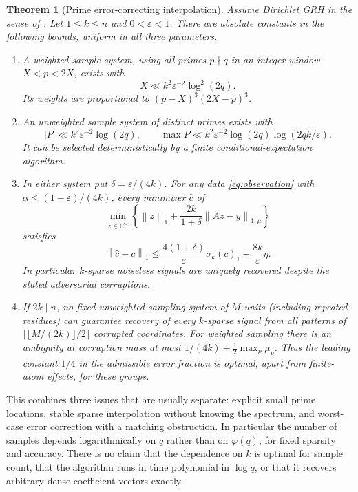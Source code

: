 \documentclass[11pt]{article}
\newtheorem{theorem}{Theorem}[section]
\theoremstyle{remark}\newtheorem{remark}[theorem]{Remark}
\newcommand{\C}{\mathbb C}
\newcommand{\norm}[1]{\left\|#1\right\|}
\begin{document}
\begin{theorem}[Prime error-correcting interpolation]\label{thm:main}
Assume Dirichlet GRH in the sense of \cite{sernau,article}. Let $1\le k\le n$ and $0<\varepsilon<1$. There are absolute constants in the following bounds, uniform in all three parameters.
\begin{enumerate}
\item A weighted sample system, using all primes $p\nmid q$ in an integer window $X<p<2X$, exists with
\[
 X\ll k^2\varepsilon^{-2}\log^2(2q).
\]
Its weights are proportional to $(p-X)^3(2X-p)^3$.
\item An unweighted sample system of distinct primes exists with
\[
 |P|\ll k^2\varepsilon^{-2}\log(2q),\qquad
 \max P\ll k^2\varepsilon^{-2}\log(2q)\log(2qk/\varepsilon).
\]
It can be selected deterministically by a finite conditional-expectation algorithm.
\item In either system put $\delta=\varepsilon/(4k)$. For any data \eqref{eq:observation} with $\alpha\le(1-\varepsilon)/(4k)$, every minimizer $\widehat c$ of
\begin{equation}\label{eq:decoder}
 \min_{z\in\C^{\widehat G}}\left\{\norm{z}_1+\frac{2k}{1+\delta}\norm{Az-y}_{1,\mu}\right\}
\end{equation}
satisfies
\begin{equation}\label{eq:stability-main}
 \norm{\widehat c-c}_1\le \frac{4(1+\delta)}{\varepsilon}\sigma_k(c)_1+
 \frac{8k}{\varepsilon}\eta.
\end{equation}
In particular $k$-sparse noiseless signals are uniquely recovered despite the stated adversarial corruptions.
\item If $2k\mid n$, no fixed unweighted sampling system of $M$ units (including repeated residues) can guarantee recovery of every $k$-sparse signal from all patterns of $\lceil\lfloor M/(2k)\rfloor/2\rceil$ corrupted coordinates. For weighted sampling there is an ambiguity at corruption mass at most $1/(4k)+\frac12\max_p\mu_p$. Thus the leading constant $1/4$ in the admissible error fraction is optimal, apart from finite-atom effects, for these groups.
\end{enumerate}
\end{theorem}

This combines three issues that are usually separate: explicit small prime locations, stable sparse interpolation without knowing the spectrum, and worst-case error correction with a matching obstruction. In particular the number of samples depends logarithmically on $q$ rather than on $\varphi(q)$, for fixed sparsity and accuracy. There is no claim that the dependence on $k$ is optimal for sample count, that the algorithm runs in time polynomial in $\log q$, or that it recovers arbitrary dense coefficient vectors exactly.
\end{document}
